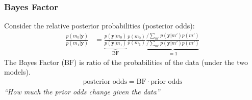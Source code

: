 \documentclass[usenames,dvipsnames,table]{beamer}
\begin{document}
\begin{frame}
\frametitle{Bayes Factor}

Consider the relative posterior probabilities (posterior odds):
\begin{align*}
\frac{p(m_0|\mathbf{y})}
     {p(m_1|\mathbf{y})}
    &=  \underbrace{\frac{p(\mathbf{y}|m_0)}
                         {p(\mathbf{y}|m_1)}}_{\textrm{BF}}
        \frac{p(m_0)}
             {p(m_1)}
        \underbrace{\frac{/\sum_{m'}p(\mathbf{y}|m')p(m')}
                         {/\sum_{m'}p(\mathbf{y}|m')p(m')}}_{=1}
\tag{10.5}
\end{align*}
The Bayes Factor ($\mathrm{BF}$) is ratio of the probabilities of the data (under the two models).
\begin{align*}
\textrm{posterior odds} = \textrm{BF} \cdot \textrm{prior odds}
\end{align*}
\emph{\textrm{``How much the prior odds change given the data''}}

\end{frame}
\end{document}
